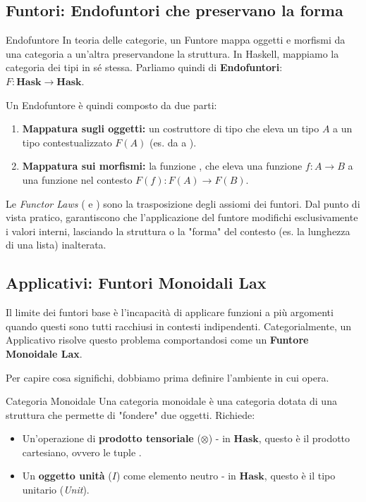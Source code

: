 \subsection{Funtori: Endofuntori che preservano la forma}

\begin{defframe}{Endofuntore}{}
In teoria delle categorie, un Funtore mappa oggetti e morfismi da una categoria a un'altra preservandone la struttura. In Haskell, mappiamo la categoria dei tipi in sé stessa. Parliamo quindi di \textbf{Endofuntori}: $F : \mathbf{Hask} \to \mathbf{Hask}$.
\end{defframe}

Un Endofuntore è quindi composto da due parti:
\begin{enumerate}
    \item \textbf{Mappatura sugli oggetti:} un costruttore di tipo che eleva un tipo $A$ a un tipo contestualizzato $F(A)$ (es. da  a ).
    \item \textbf{Mappatura sui morfismi:} la funzione , che eleva una funzione $f : A \to B$ a una funzione nel contesto $F(f) : F(A) \to F(B)$.
\end{enumerate}

Le \textit{Functor Laws} ( e ) sono la trasposizione degli assiomi dei funtori. Dal punto di vista pratico, garantiscono che l'applicazione del funtore modifichi esclusivamente i valori interni, lasciando la struttura o la "forma" del contesto (es. la lunghezza di una lista) inalterata.

\subsection{Applicativi: Funtori Monoidali Lax}

Il limite dei funtori base è l'incapacità di applicare funzioni a più argomenti quando questi sono tutti racchiusi in contesti indipendenti. Categorialmente, un Applicativo risolve questo problema comportandosi come un \textbf{Funtore Monoidale Lax}.

Per capire cosa significhi, dobbiamo prima definire l'ambiente in cui opera.

\begin{defframe}{Categoria Monoidale}{}
Una categoria monoidale è una categoria dotata di una struttura che permette di "fondere" due oggetti. Richiede:
\begin{itemize}
    \item Un'operazione di \textbf{prodotto tensoriale} ($\otimes$) - in $\mathbf{Hask}$, questo è il prodotto cartesiano, ovvero le tuple .
    \item Un \textbf{oggetto unità} ($I$) come elemento neutro - in $\mathbf{Hask}$, questo è il tipo unitario \code{()} (\textit{Unit}).
\end{itemize}
\end{defframe}


